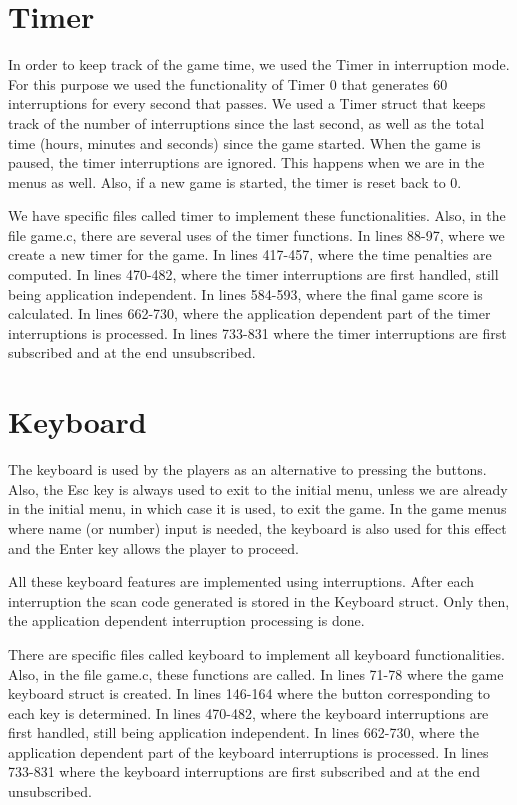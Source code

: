 \documentclass[11pt,a4paper,reqno]{report}
\numberwithin{equation}{section}
\begin{document}
\section{Timer}

In order to keep track of the game time, we used the Timer in interruption mode. For this purpose we used the functionality of Timer 0 that generates 60 interruptions for every second that passes. We used a Timer struct that keeps track of the number of interruptions since the last second, as well as the total time (hours, minutes and seconds) since the game started. When the game is paused, the timer interruptions are ignored. This happens when we are in the menus as well. Also, if a new game is started, the timer is reset back to 0.

We have specific files called timer to implement these functionalities. Also, in the file game.c, there are several uses of the timer functions. In lines 88-97, where we create a new timer for the game. In lines 417-457, where the time penalties are computed. In lines 470-482, where the timer interruptions are first handled, still being application independent. In lines 584-593, where the final game score is calculated. In lines 662-730, where the application dependent part of the timer interruptions is processed. In lines 733-831 where the timer interruptions are first subscribed and at the end unsubscribed.

\section{Keyboard}

The keyboard is used by the players as an alternative to pressing the buttons. Also, the Esc key is always used to exit to the initial menu, unless we are already in the initial menu, in which case it is used, to exit the game. In the game menus where name (or number) input is needed, the keyboard is also used for this effect and the Enter key allows the player to proceed.

All these keyboard features are implemented using interruptions. After each interruption the scan code generated is stored in the Keyboard struct. Only then, the application dependent interruption processing is done.

There are specific files called keyboard to implement all keyboard functionalities. Also, in the file game.c, these functions are called. In lines 71-78 where the game keyboard struct is created. In lines 146-164 where the button corresponding to each key is determined. In lines 470-482, where the keyboard interruptions are first handled, still being application independent. In lines 662-730, where the application dependent part of the keyboard interruptions is processed. In lines 733-831 where the keyboard interruptions are first subscribed and at the end unsubscribed.
\end{document}
